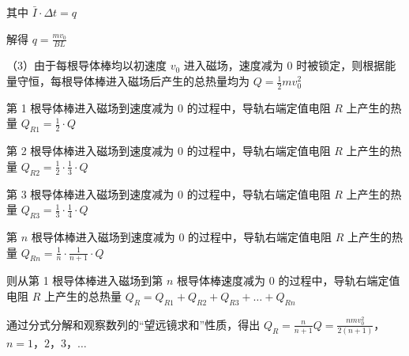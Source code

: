 \documentclass[\gkver]{gaokaozhenti}
\begin{document}
\begin{enumerate}
{其中 $\bar{I} \cdot \Delta t = q$

解得 $q = \frac{mv_{0}}{BL}$

（3）由于每根导体棒均以初速度 $v_{0}$ 进入磁场，速度减为 0 时被锁定，则根据能量守恒，每根导体棒进入磁场后产生的总热量均为 $Q = \frac{1}{2}mv_{0}^{2}$

第 1 根导体棒进入磁场到速度减为 0 的过程中，导轨右端定值电阻 $R$ 上产生的热量 $Q_{R1} = \frac{1}{2} \cdot Q$

第 2 根导体棒进入磁场到速度减为 0 的过程中，导轨右端定值电阻 $R$ 上产生的热量 $Q_{R2} = \frac{1}{2} \cdot \frac{1}{3} \cdot Q$

第 3 根导体棒进入磁场到速度减为 0 的过程中，导轨右端定值电阻 $R$ 上产生的热量 $Q_{R3} = \frac{1}{3} \cdot \frac{1}{4} \cdot Q$

第 $n$ 根导体棒进入磁场到速度减为 0 的过程中，导轨右端定值电阻 $R$ 上产生的热量 $Q_{Rn} = \frac{1}{n} \cdot \frac{1}{n + 1} \cdot Q$

则从第 1 根导体棒进入磁场到第 $n$ 根导体棒速度减为 0 的过程中，导轨右端定值电阻 $R$ 上产生的总热量 $Q_{R} = Q_{R1} + Q_{R2} + Q_{R3} + \ldots + Q_{Rn}$

通过分式分解和观察数列的“望远镜求和”性质，得出 $Q_{R} = \frac{n}{n + 1}Q = \frac{nmv_{0}^{2}}{2(n + 1)}$，$n = 1$，$2$，$3$，$\ldots$
}

\end{enumerate}
\end{document}
